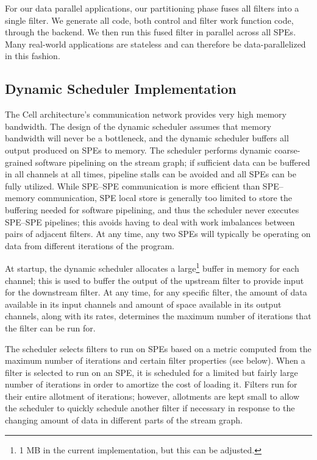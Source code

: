 For our data parallel applications, our partitioning
phase fuses all filters into a single filter. We generate all code, both control and
filter work function code, through the backend. We then run this fused filter
in parallel across all SPEs. Many real-world applications are stateless and can
therefore be data-parallelized in this fashion.



\subsection{Dynamic Scheduler Implementation}\label{ch:ds:imp}

The Cell architecture's communication network provides very high
memory bandwidth. The design of the dynamic scheduler assumes that
memory bandwidth will never be a bottleneck, and the dynamic scheduler
buffers all output produced on SPEs to memory. The scheduler performs
dynamic coarse-grained software pipelining on the stream graph; if
sufficient data can be buffered in all channels at all times, pipeline
stalls can be avoided and all SPEs can be fully utilized. While
SPE--SPE communication is more efficient than SPE--memory
communication, SPE local store is generally too limited to store the
buffering needed for software pipelining, and thus the scheduler never
executes SPE--SPE pipelines; this avoids having to deal with work
imbalances between pairs of adjacent filters. At any time, any two
SPEs will typically be operating on data from different 
iterations of the program.

At startup, the dynamic scheduler allocates a large\footnote{1 MB in
the current implementation, but this can be adjusted.} buffer in
memory for each channel; this is used to buffer the output of the
upstream filter to provide input for the downstream filter. At any
time, for any specific filter, the amount of data available in its
input channels and amount of space available in its output channels,
along with its rates, determines the maximum number of iterations that
the filter can be run for.

The scheduler selects filters to run on SPEs based on a metric
computed from the maximum number of iterations and certain filter
properties (see below). When a filter is selected to run on an SPE, it
is scheduled for a limited but fairly large number of iterations in
order to amortize the cost of loading it. Filters run for their entire
allotment of iterations; however, allotments are kept small to allow
the scheduler to quickly schedule another filter if necessary in
response to the changing amount of data in different parts of the stream graph.

